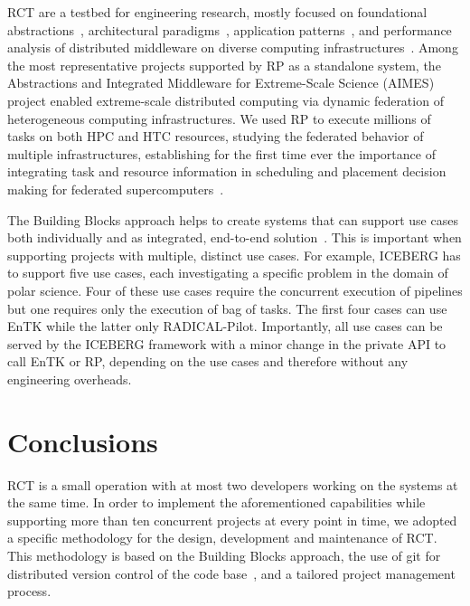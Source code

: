 \documentclass[preprint,12pt, a4paper]{elsarticle}
\begin{document}
RCT are a testbed for engineering research, mostly focused on foundational
abstractions~\cite{turilli2017evaluating}, architectural
paradigms~\cite{turilli2018comprehensive}, application
patterns~\cite{balasubramanian2016extasy,balasubramanian2018harnessing}, and
performance analysis of distributed middleware on diverse computing
infrastructures~\cite{turilli2017evaluating,dakka2018high}. Among the most
representative projects supported by RP as a standalone system, the
Abstractions and Integrated Middleware for Extreme-Scale Science (AIMES)
project enabled extreme-scale distributed computing via dynamic federation of
heterogeneous computing infrastructures. We used RP to execute millions of
tasks on both HPC and HTC resources, studying the federated behavior of
multiple infrastructures, establishing for the first time ever the importance
of integrating task and resource information in scheduling and placement
decision making for federated supercomputers~\cite{turilli2016integrating}.

The Building Blocks approach helps to create systems that can support use
cases both individually and as integrated, end-to-end
solution~\cite{turilli2019middleware}. This is important when supporting
projects with multiple, distinct use cases. For example, ICEBERG has to
support five use cases, each investigating a specific problem in the domain
of polar science. Four of these use cases require the concurrent execution of
pipelines but one requires only the execution of bag of tasks. The first four
cases can use EnTK while the latter only RADICAL-Pilot. Importantly, all use
cases can be served by the ICEBERG framework with a minor change in the
private API to call EnTK or RP, depending on the use cases and therefore
without any engineering overheads.


\section{Conclusions}\label{sec:conclusions}

RCT is a small operation with at most two developers working on the systems
at the same time. In order to implement the aforementioned capabilities while
supporting more than ten concurrent projects at every point in time, we
adopted a specific methodology for the design, development and maintenance of
RCT\@. This methodology is based on the Building Blocks approach, the use of
git for distributed version control of the code base~\cite{github-rct}, and a
tailored project management process.
\end{document}
